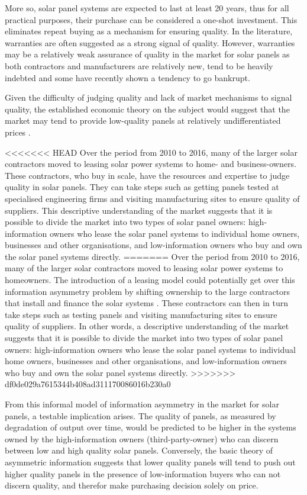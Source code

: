 \documentclass[12pt]{article}
\begin{document}
More so, solar panel systems are expected to last at least 20 years, thus for all practical purposes, their purchase can be considered a one-shot investment. This eliminates repeat buying as a mechanism for ensuring quality. In the literature, warranties are often suggested as a strong signal of quality. However, warranties may be a relatively weak assurance of quality in the market for solar panels as both contractors and manufacturers are relatively new, tend to be heavily indebted and some have recently shown a tendency to go bankrupt.

Given the difficulty of judging quality and lack of market mechanisms to signal quality, the established economic theory on the subject would suggest that the market may tend to provide low-quality panels at relatively undifferentiated prices \citep{tirole_theory_1988}.

<<<<<<< HEAD
Over the period from 2010 to 2016, many of the larger solar contractors moved to leasing solar power systems to home- and business-owners\citep{mauritzen_cost_2017}. These contractors, who buy in scale, have the resources and expertise to judge quality in solar panels. They can take steps such as getting panels tested at specialised engineering firms and visiting manufacturing sites to ensure quality of suppliers. This descriptive understanding of the market suggests that it is possible to divide the market into two types of solar panel owners: high-information owners who lease the solar panel systems to individual home owners, businesses and other organisations, and low-information owners who buy and own the solar panel systems directly.
=======
Over the period from 2010 to 2016, many of the larger solar contractors moved to leasing solar power systems to homeowners. The introduction of a leasing model could potentially get over this information asymmetry problem by shifting ownership to the large contractors that install and finance the solar systems \citep{mauritzen_cost_2017}. These contractors can then in turn take steps such as testing panels and visiting manufacturing sites to ensure quality of suppliers. In other words, a descriptive understanding of the market suggests that it is possible to divide the market into two types of solar panel owners: high-information owners who lease the solar panel systems to individual home owners, businesses and other organisations, and low-information owners who buy and own the solar panel systems directly.
>>>>>>> df0de029a7615344b408ad311170086016b230a0

From this informal model of information asymmetry in the market for solar panels, a testable implication arises. The quality of panels, as measured by degradation of output over time, would be predicted to be higher in the systems owned by the high-information owners (third-party-owner) who can discern between low and high quality solar panels. Conversely, the basic theory of asymmetric information suggests that lower quality panels will tend to push out higher quality panels in the presence of low-information buyers who can not discern quality, and therefor make purchasing decision solely on price.
\end{document}
